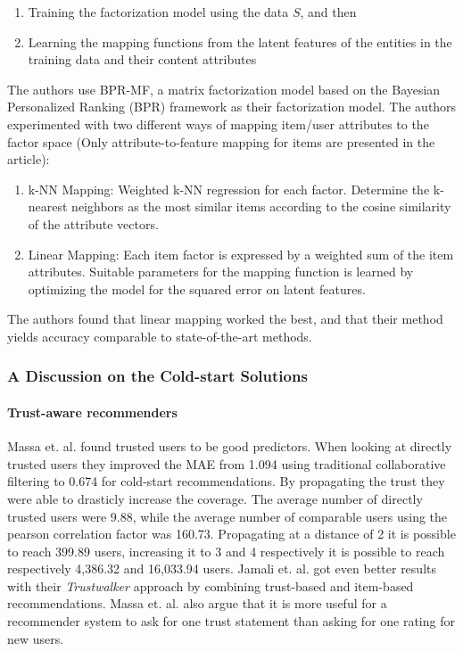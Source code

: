 \begin{enumerate}
\item Training the factorization model using the data $S$, and then
\item Learning the mapping functions from the latent features of the entities in the training data and their content attributes
\end{enumerate}

The authors use BPR-MF, a matrix factorization model based on the Bayesian Personalized Ranking (BPR) framework as their factorization model. The authors experimented with two different ways of mapping item/user attributes to the factor space (Only attribute-to-feature mapping for items are presented in the article):

\begin{enumerate}
\item k-NN Mapping:	Weighted k-NN regression for each factor. Determine the k-nearest neighbors as the most similar items according to the cosine similarity of the attribute vectors.
\item Linear Mapping: Each item factor is expressed by a weighted sum of the item attributes. Suitable parameters for the mapping function is learned by optimizing the model for the squared error on latent features.
\end{enumerate}

The authors found that linear mapping worked the best, and that their method yields accuracy comparable to state-of-the-art methods.

\subsubsection{A Discussion on the Cold-start Solutions}

\paragraph{Trust-aware recommenders}

Massa et. al. \cite{Massa2007} found trusted users to be good predictors. When
looking at directly trusted users they improved the MAE from 1.094 using
traditional collaborative filtering to 0.674 for cold-start recommendations. By
propagating the trust they were able to drasticly increase the coverage. The
average number of directly trusted users were 9.88, while the average number of
comparable users using the pearson correlation factor was 160.73. Propagating
at a distance of 2 it is possible to reach 399.89 users, increasing it to 3 and
4 respectively it is possible to reach respectively 4,386.32 and 16,033.94
users. Jamali et. al. \cite{Jamali2009} got even better results with their
\emph{Trustwalker} approach by combining trust-based and item-based
recommendations. Massa et. al. \cite{Massa2004} also argue that it is more
useful for a recommender system to ask for one trust statement than asking for
one rating for new users.

